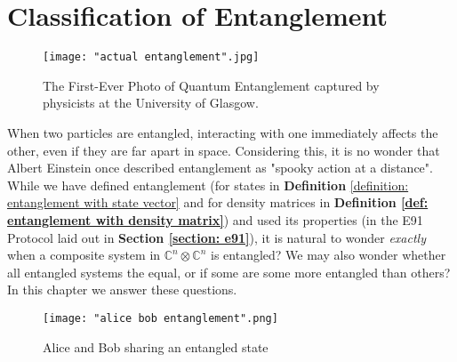 
\chapter{Classification of Entanglement} %

\label{Chapter6-classification of entanglement} %
\begin{figure}[h]
    \centering
    \texttt{[image: "actual entanglement".jpg]}
    \caption{The First-Ever Photo of Quantum Entanglement captured by physicists at the University of Glasgow. \cite{moreau2019imaging}}
    \label{fig:actual entanglemen}
\end{figure}

When two particles are entangled, interacting with one immediately affects the other, even if they are far apart in space.  Considering this, it is no wonder that Albert Einstein once described entanglement as "spooky action at a distance". While we have defined entanglement (for states in {\bf{Definition}} \ref{definition: entanglement with state vector} and for density matrices in \textbf{Definition \ref{def: entanglement with density matrix}}) and used its properties (in the E91 Protocol laid out in \textbf{Section \ref{section: e91}}), it is natural to wonder {\emph{exactly}} when a composite system in $\mathbb{C}^n \otimes \mathbb{C}^n$ is entangled?
We may also wonder whether all entangled systems the equal, or if some are some more entangled than others?  In this chapter we answer these questions.


\begin{figure}[h]
    \centering
    \texttt{[image: "alice bob entanglement".png]}
    \caption{Alice and Bob sharing an entangled state}
    \label{fig:entanglement}
\end{figure}


